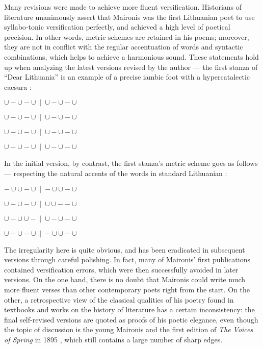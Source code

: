 \begin{paper}
Many revisions were made to achieve more fluent
versification. Historians of literature unanimously assert that Maironis
was the first Lithuanian poet to use syllabo-tonic versification perfectly, and achieved a high level of poetical precision. In other words, metric schemes are retained in his poems; moreover, they are not in
conflict with the regular accentuation of words and syntactic
combinations, which helps to achieve a harmonious sound. These
statements hold up when analyzing the latest versions revised by the
author --- the first stanza of ``Dear Lithuania'' \citep[58]{maironis_maironio_1927} is
an example of a precise iambic foot with a hypercatalectic caesura \citep[234--5]{girdzijauskas_lietuviu_1966}:

\begin{center}
$\cup - \cup - \cup \| \cup - \cup - \cup$

$\cup - \cup - \cup \| \cup - \cup - \cup$

$\cup - \cup - \cup \| \cup - \cup - \cup$

$\cup - \cup - \cup \| \cup - \cup - \cup$
\end{center}

\noindent In the initial version, by contrast, the first stanza's metric scheme goes as follows --- respecting  the natural accents of the words in standard
Lithuanian \citep{maironis_daina_1891}:

\begin{center}
$- \cup \cup - \cup \| - \cup \cup - \cup$

$\cup - \cup - \cup \| \cup \cup - - \cup$

$\cup - \cup \cup - \| \cup - \cup - \cup$

$\cup - \cup - \cup \| - \cup \cup - \cup$
\end{center}

\noindent The irregularity here is quite obvious, and has been eradicated in subsequent versions through careful polishing.
In fact, many of Maironis' first publications contained versification
errors, which were then successfully avoided in later versions. On the
one hand, there is no doubt that Maironis
could write much more fluent verses than other contemporary poets right from the start. On
the other, a retrospective view of the classical qualities of his poetry
found in textbooks and works on the history of literature has a certain
inconsistency: the final self-revised versions are quoted as proofs of
his poetic elegance, even though the topic of discussion is the young
Maironis and the first edition of \emph{The Voices of Spring} in 1895
\citep[98]{zaborskaite_maironis_1987}, which still contains a large number of sharp edges.


\end{paper}

